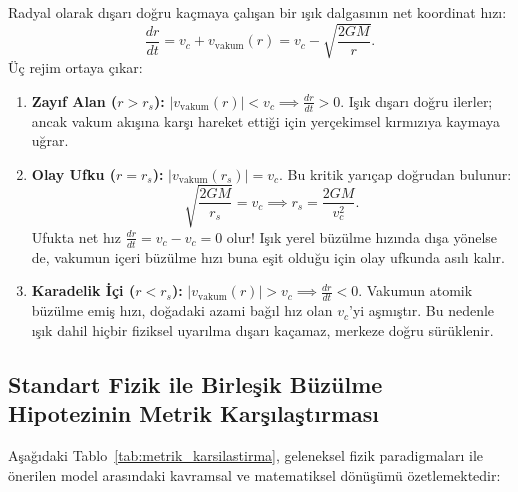 Radyal olarak dışarı doğru kaçmaya çalışan bir ışık dalgasının net koordinat hızı:
\begin{equation}
    \frac{dr}{dt} = v_c + v_{\mathrm{vakum}}(r) = v_c - \sqrt{\frac{2GM}{r}}.
    \label{eq:isik_kacis_hizi}
\end{equation}
Üç rejim ortaya çıkar:
\begin{enumerate}
    \item \textbf{Zayıf Alan ($r > r_s$):} $|v_{\mathrm{vakum}}(r)| < v_c \implies \frac{dr}{dt} > 0$. Işık dışarı doğru ilerler; ancak vakum akışına karşı hareket ettiği için yerçekimsel kırmızıya kaymaya uğrar.
    \item \textbf{Olay Ufku ($r = r_s$):} $|v_{\mathrm{vakum}}(r_s)| = v_c$. Bu kritik yarıçap doğrudan bulunur:
          \begin{equation}
              \sqrt{\frac{2GM}{r_s}} = v_c \implies r_s = \frac{2GM}{v_c^2}.
              \label{eq:olay_ufku_turetme}
          \end{equation}
          Ufukta net hız $\frac{dr}{dt} = v_c - v_c = 0$ olur! Işık yerel büzülme hızında dışa yönelse de, vakumun içeri büzülme hızı buna eşit olduğu için olay ufkunda asılı kalır.
    \item \textbf{Karadelik İçi ($r < r_s$):} $|v_{\mathrm{vakum}}(r)| > v_c \implies \frac{dr}{dt} < 0$. Vakumun atomik büzülme emiş hızı, doğadaki azami bağıl hız olan $v_c$'yi aşmıştır. Bu nedenle ışık dahil hiçbir fiziksel uyarılma dışarı kaçamaz, merkeze doğru sürüklenir.
\end{enumerate}

\subsection{Standart Fizik ile Birleşik Büzülme Hipotezinin Metrik Karşılaştırması}

Aşağıdaki Tablo~\ref{tab:metrik_karsilastirma}, geleneksel fizik paradigmaları ile önerilen model arasındaki kavramsal ve matematiksel dönüşümü özetlemektedir:

